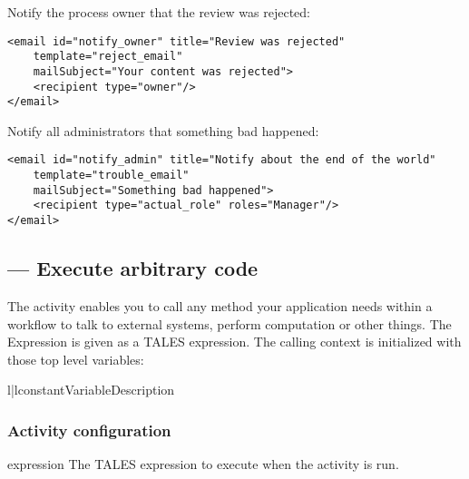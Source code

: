   Notify the process owner that the review was rejected: 

\begin{verbatim}
<email id="notify_owner" title="Review was rejected"
    template="reject_email"
    mailSubject="Your content was rejected">
    <recipient type="owner"/>
</email>
\end{verbatim}

  Notify all administrators that something bad happened:

\begin{verbatim}
<email id="notify_admin" title="Notify about the end of the world"
    template="trouble_email"
    mailSubject="Something bad happened">
    <recipient type="actual_role" roles="Manager"/>
</email>
\end{verbatim}

 \subsection{ --- Execute arbitrary code}
 
 The  activity enables you to call any method
 your application needs within a workflow to talk to external systems,
 perform computation or other things. The Expression is given as a TALES expression. The calling context
 is initialized with those top level variables:

 \begin{tableii}{l|l}{constant}{Variable}{Description}
 \end{tableii}

  \subsubsection{Activity configuration}

    \begin{memberdesc}{expression}
        The TALES expression to execute when the activity is run.
    \end{memberdesc}

